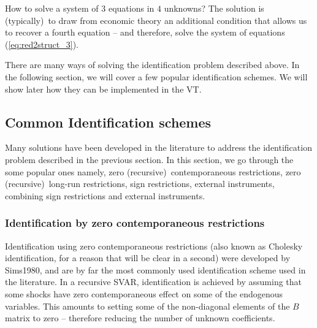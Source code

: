 \documentclass[10pt]{article}
\begin{document}
How to solve a system of $3$ equations in $4$ unknowns? The solution is
(typically)\ to draw from economic theory an additional condition that
allows us to recover a fourth equation -- and therefore, solve the system of
equations (\ref{eq:red2struct_3}).

There are many ways of solving the identification problem described above.
In the following section, we will cover a few popular identification
schemes. We will show later how they can be implemented in the VT.

\subsection{Common Identification schemes}

Many solutions have been developed in the literature to address the
identification problem described in the previous section. In this section,
we go through the some popular ones namely, zero (recursive)\
contemporaneous restrictions, zero (recursive)\ long-run restrictions, sign
restrictions, external instruments, combining sign restrictions and external
instruments.

\subsubsection{Identification by zero contemporaneous restrictions}

Identification using zero contemporaneous restrictions (also known as
Cholesky identification, for a reason that will be clear in a second) were
developed by Sims1980, and are by far the most commonly used identification
scheme used in the literature. In a recursive SVAR, identification is
achieved by assuming that some shocks have zero contemporaneous effect on
some of the endogenous variables. This amounts to setting some of the
non-diagonal elements of the $B$ matrix to zero -- therefore reducing the
number of unknown coefficients.
\end{document}
